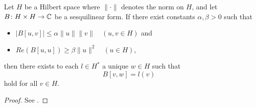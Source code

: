 \begin{atheorem}
	Let $H$ be a Hilbert space where $\| \cdot \|$ denotes the norm on $H$, and let $B \colon H \times H \rightarrow \mathbb{C}$ be a sesquilinear form. If there exist constants $\alpha, \beta > 0$ such that
		\begin{itemize}
			\item $\left| B[u, v] \right| \leq \alpha \| u \| \|v \| \quad (u, v \in H)$ and
			\item $Re(B[u,u]) \geq \beta \|u\|^{2} \quad (u \in H)$,
		\end{itemize}
		then there exists to each $l \in H^{*}$ a unique $w \in H$ such that
		\[ B[v, w] = l(v) \]
		hold for all $v \in H$.
		
		\begin{proof}
			See \cite[Amd to problem 51]{plum2015dglhr}.
		\end{proof}
\end{atheorem}